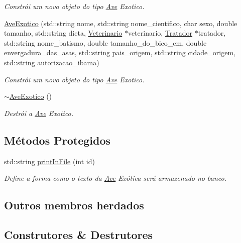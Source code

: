 \begin{DoxyCompactItemize}
\begin{DoxyCompactList}\small\item\em Constrói um novo objeto do tipo \hyperlink{classAve}{Ave} Exotico. \end{DoxyCompactList}\item 
\hyperlink{classAveExotico_a853f84d1f167facf4a3892cd9a37750a}{Ave\+Exotico} (std\+::string nome, std\+::string nome\+\_\+cientifico, char sexo, double tamanho, std\+::string dieta, \hyperlink{classVeterinario}{Veterinario} $\ast$veterinario, \hyperlink{classTratador}{Tratador} $\ast$tratador, std\+::string nome\+\_\+batismo, double tamanho\+\_\+do\+\_\+bico\+\_\+cm, double envergadura\+\_\+das\+\_\+asas, std\+::string pais\+\_\+origem, std\+::string cidade\+\_\+origem, std\+::string autorizacao\+\_\+ibama)
\begin{DoxyCompactList}\small\item\em Constrói um novo objeto do tipo \hyperlink{classAve}{Ave} Exotico. \end{DoxyCompactList}\item 
\mbox{\label{classAveExotico_a5fe9190a5ec320d8d05bab3dc3cc2b5c}} 
\hyperlink{classAveExotico_a5fe9190a5ec320d8d05bab3dc3cc2b5c}{$\sim$\+Ave\+Exotico} ()
\begin{DoxyCompactList}\small\item\em Destrói a \hyperlink{classAve}{Ave} Exotico. \end{DoxyCompactList}\end{DoxyCompactItemize}
\subsection*{Métodos Protegidos}
\begin{DoxyCompactItemize}
\item 
std\+::string \hyperlink{classAveExotico_a4ba81def12131f047b3800e5f10a983b}{print\+In\+File} (int id)
\begin{DoxyCompactList}\small\item\em Define a forma como o texto da \hyperlink{classAve}{Ave} Exótica será armazenado no banco. \end{DoxyCompactList}\end{DoxyCompactItemize}
\subsection*{Outros membros herdados}


\subsection{Construtores \& Destrutores}
\mbox{\label{classAveExotico_a4bc404b26f0b3dc4025bc7c9ec5cedd3}} 
